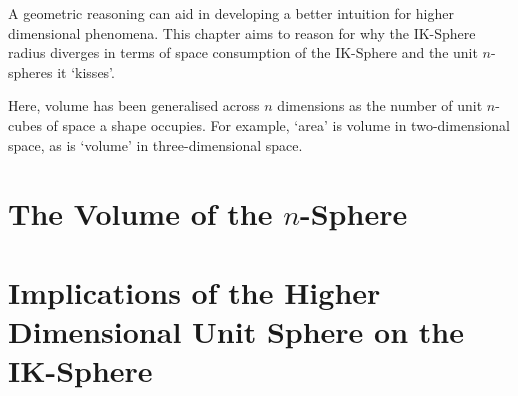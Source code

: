 A geometric reasoning can aid in developing a better intuition for higher dimensional phenomena. This chapter aims to reason for why the IK-Sphere radius diverges in terms of space consumption of the IK-Sphere and the unit $n$-spheres it `kisses'.

\begin{definition}[Volume]
    Here, volume has been generalised across $n$ dimensions as the number of unit $n$-cubes of space a shape occupies. For example, `area' is volume in two-dimensional space, as is `volume' in three-dimensional space. 
\end{definition}

\section{The Volume of the $n$-Sphere}

\section{Implications of the Higher Dimensional Unit Sphere on the IK-Sphere}